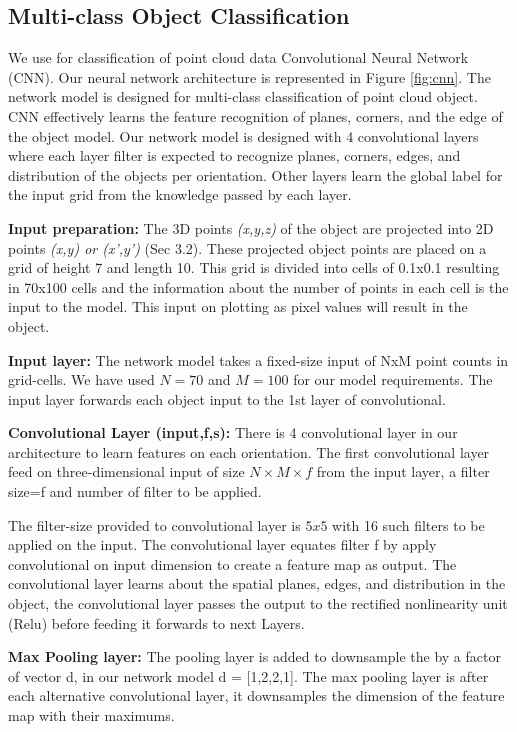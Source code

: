 \subsection{Multi-class Object Classification} 
We use for classification of point cloud data Convolutional Neural Network (CNN).
Our neural network architecture is represented in Figure \ref{fig:cnn}.
The network model is designed for multi-class classification of point cloud object.
CNN effectively learns the feature recognition of planes, corners, and the edge of the object model.
Our network model is designed with 4 convolutional layers where each layer filter is expected to
recognize planes, corners, edges, and distribution of the objects per orientation.
Other layers learn the global label for the input grid from the knowledge passed by each layer.

\textbf{Input preparation:}
The 3D points \textit{(x,y,z)} of the object are projected into 2D points \textit{(x,y) or (x',y')} (Sec 3.2). 
These projected object points are placed on a grid of height 7 and length 10. 
This grid is divided into cells of 0.1x0.1 resulting in 70x100 cells and the information about the number of points in each cell is the input to the model.
This input on plotting as pixel values will result in the object.

\textbf{Input layer:}
The network model takes a fixed-size input of NxM point counts in grid-cells. We have 
used $N=70$ and $M=100$ for our model requirements. The input layer forwards each object input to the 1st layer
of convolutional.


\textbf{Convolutional Layer (input,f,s):}
There is 4 convolutional layer in our architecture to learn features on each orientation.
The first convolutional layer feed on three-dimensional input of size $N \times  M \times f$ from
the input layer, a filter size=f and number of filter to be applied.

The filter-size provided to convolutional layer is $5x5$ with 16 such filters to be applied on the input.
The convolutional layer equates filter f by apply convolutional on input dimension to create a feature map as output.
The convolutional layer learns about the spatial planes, edges, and distribution in the object, 
the convolutional layer passes the output to the rectified nonlinearity unit (Relu) before feeding
it forwards to next Layers.

\textbf{Max Pooling layer:} 
The pooling layer is added to downsample the by a factor of vector d, in
our network model d = [1,2,2,1]. The max pooling layer is after each alternative convolutional
layer, it downsamples the dimension of the feature map with their maximums.

